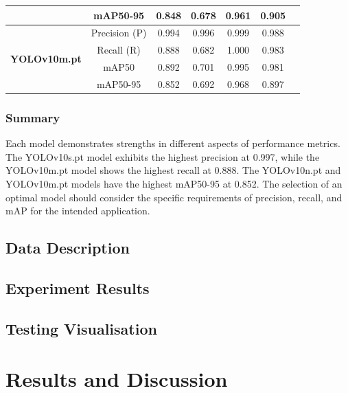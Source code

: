 \documentclass[12pt,oneside]{book} %
\begin{document}
\begin{table}[h!]
\begin{adjustbox}{max width=\textwidth}
\begin{tabular}{lcccccc}
                                                  & mAP50-95        & 0.848        & 0.678                       & 0.961                          & 0.905                     \\
            \midrule
            \multirow{4}{*}{\textbf{YOLOv10m.pt}} & Precision (P)   & 0.994        & 0.996                       & 0.999                          & 0.988                     \\
                                                  & Recall (R)      & 0.888        & 0.682                       & 1.000                          & 0.983                     \\
                                                  & mAP50           & 0.892        & 0.701                       & 0.995                          & 0.981                     \\
                                                  & mAP50-95        & 0.852        & 0.692                       & 0.968                          & 0.897                     \\
            \bottomrule
        \end{tabular}
    \end{adjustbox}
    \label{tab:comparison}
\end{table}

\subsection{Summary}

Each model demonstrates strengths in different aspects of performance metrics.
The YOLOv10s.pt model exhibits the highest precision at 0.997, while the
YOLOv10m.pt model shows the highest recall at 0.888. The YOLOv10n.pt and
YOLOv10m.pt models have the highest mAP50-95 at 0.852. The selection of an
optimal model should consider the specific requirements of precision, recall,
and mAP for the intended application.

\section{Data Description}

\section{Experiment Results}

\section{Testing Visualisation}

\chapter{Results and Discussion}

%



\end{document}
